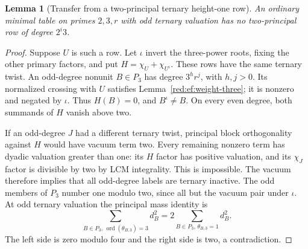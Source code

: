 \documentclass[11pt,a4paper]{article}
\numberwithin{equation}{section}
\newtheorem{lemma}[theorem]{Lemma}
\begin{document}
\begin{lemma}[Transfer from a two-principal ternary height-one row]
\label{red:ef:ternary-transfer}
An ordinary minimal table on primes $2,3,r$ with odd ternary
valuation has no two-principal row of degree $2^i3$.
\end{lemma}
\begin{proof}
Suppose $U$ is such a row. Let $\iota$ invert the three-power
roots, fixing the other primary factors, and put
$H=\chi_U+\chi_{U^\iota}$. These rows have the same ternary
twist. An odd-degree nonunit $B\in P_3$ has degree $3^h r^j$,
with $h,j>0$. Its normalized crossing with $U$ satisfies
Lemma~\ref{red:ef:weight-three}; it is nonzero and negated by
$\iota$. Thus $H(B)=0$, and $B^\iota\ne B$.
On every even degree, both summands of $H$ vanish above two.

If an odd-degree $J$ had a different ternary twist, principal
block orthogonality against $H$ would have vacuum term two.
Every remaining nonzero term has dyadic valuation greater than
one: its $H$ factor has positive valuation, and its $\chi_J$
factor is divisible by two by LCM integrality. This is impossible.
The vacuum therefore implies that all odd-degree labels are
ternary inactive. The odd members of $P_3$ number one modulo
two, since all but the vacuum pair under $\iota$. At odd ternary
valuation the principal mass identity is
\[
 \sum_{B\in P_3,\,\operatorname{ord}(\theta_{B,3})=3}d_B^2
       =2\sum_{B\in P_3,\,\theta_{B,3}=1}d_B^2.
\]
The left side is zero modulo four and the right side is two,
a contradiction.
\end{proof}
\end{document}
